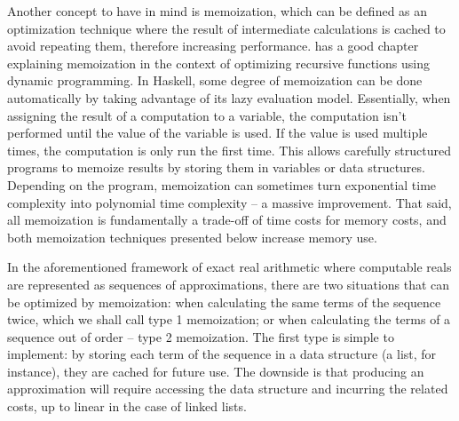 Another concept to have in mind is memoization, which can be defined as an optimization technique where the result of intermediate calculations is cached to avoid repeating them, therefore increasing performance. \cite{thompson-1996} has a good chapter explaining memoization in the context of optimizing recursive functions using dynamic programming. In Haskell, some degree of memoization can be done automatically by taking advantage of its lazy evaluation model. Essentially, when assigning the result of a computation to a variable, the computation isn't performed until the value of the variable is used. If the value is used multiple times, the computation is only run the first time. This allows carefully structured programs to memoize results by storing them in variables or data structures. Depending on the program, memoization can sometimes turn exponential time complexity into polynomial time complexity -- a massive improvement. That said, all memoization is fundamentally a trade-off of time costs for memory costs, and both memoization techniques presented below increase memory use.

In the aforementioned framework of exact real arithmetic where computable reals are represented as sequences of approximations, there are two situations that can be optimized by memoization: when calculating the same terms of the sequence twice, which we shall call type 1 memoization; or when calculating the terms of a sequence out of order -- type 2 memoization. The first type is simple to implement: by storing each term of the sequence in a data structure (a list, for instance), they are cached for future use. The downside is that producing an approximation will require accessing the data structure and incurring the related costs, up to linear in the case of linked lists.

